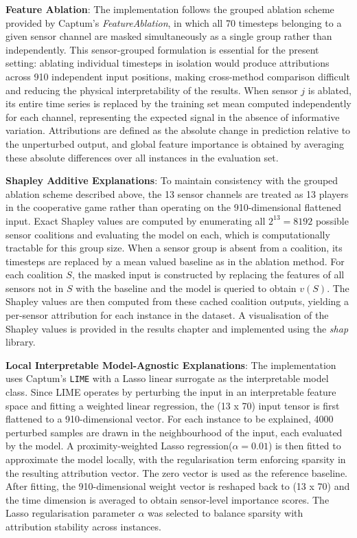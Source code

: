 \textbf{Feature Ablation}: The implementation follows the grouped ablation scheme provided by Captum's \textsl{FeatureAblation}, in which all 70 timesteps belonging to a given sensor channel are masked simultaneously as a single group rather than independently. This sensor-grouped formulation is essential for the present setting: ablating individual timesteps in isolation would produce attributions across 910 independent input positions, making cross-method comparison difficult and reducing the physical interpretability of the results. When sensor $j$ is ablated, its entire time series is replaced by the training set mean computed independently for each channel, representing the expected signal in the absence of informative variation. Attributions are defined as the absolute change in prediction relative to the unperturbed output, and global feature importance is obtained by averaging these absolute differences over all instances in the evaluation set.

\textbf{Shapley Additive Explanations}: To maintain consistency with the grouped ablation scheme described above, the 13 sensor channels are treated as 13 players in the cooperative game rather than operating on the 910-dimensional flattened input. Exact Shapley values are computed by enumerating all $2^{13} = \text{8192}$ possible sensor coalitions and evaluating the model on each, which is computationally tractable for this group size. When a sensor group is absent from a coalition, its timesteps are replaced by a mean valued baseline as in the ablation method. For each coalition $S$, the masked input is constructed by replacing the features of all sensors not in $S$ with the baseline and the model is queried to obtain $v(S)$. The Shapley values are then computed from these cached coalition outputs, yielding a per-sensor attribution for each instance in the dataset. A visualisation of the Shapley values is provided in the results chapter and implemented using the \textsl{shap} library.

\textbf{Local Interpretable Model-Agnostic Explanations}: The implementation uses Captum's \texttt{LIME} with a Lasso linear surrogate as the interpretable model class. Since LIME operates by perturbing the input in an interpretable feature space and fitting a weighted linear regression, the (13 x 70) input tensor is first flattened to a 910-dimensional vector. For each instance to be explained, 4000 perturbed samples are drawn in the neighbourhood of the input, each evaluated by the model. A proximity-weighted Lasso regression($\alpha = 0.01$) is then fitted to approximate the model locally, with the regularisation term enforcing sparsity in the resulting attribution vector. The zero vector is used as the reference baseline. After fitting, the 910-dimensional weight vector is reshaped back to (13 x 70) and the time dimension is averaged to obtain sensor-level importance scores. The Lasso regularisation parameter $\alpha$ was selected to balance sparsity with attribution stability across instances.

